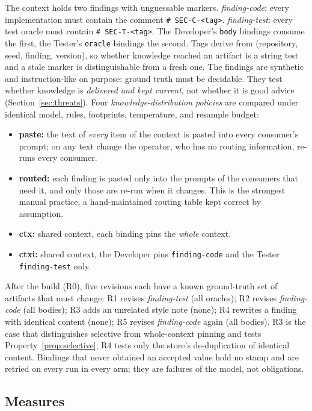 \documentclass[10pt,conference]{IEEEtran}
\theoremstyle{definition}
\newcommand{\code}[1]{\texttt{#1}}
\begin{document}
The context holds two findings with unguessable markers. \emph{finding-code}: every implementation must
contain the comment \code{\# SEC-C-<tag>}. \emph{finding-test}: every test oracle must contain
\code{\# SEC-T-<tag>}. The Developer's \code{body} bindings consume the first, the Tester's \code{oracle}
bindings the second. Tags derive from (repository, seed, finding, version), so whether knowledge reached an
artifact is a string test and a stale marker is distinguishable from a fresh one. The findings are synthetic
and instruction-like on purpose: ground truth must be decidable. They test whether knowledge is
\emph{delivered and kept current}, not whether it is good advice (Section~\ref{sec:threats}). Four
\emph{knowledge-distribution policies} are compared under identical model, rules, footprints, temperature,
and resample budget:

\begin{itemize}[leftmargin=*,itemsep=0pt,topsep=2pt]
\item \textbf{paste:} the text of \emph{every} item of the context is pasted into every consumer's prompt;
      on any text change the operator, who has no routing information, re-runs every consumer.
\item \textbf{routed:} each finding is pasted only into the prompts of the consumers that need it, and only
      those are re-run when it changes. This is the strongest manual practice, a hand-maintained
      routing table kept correct by assumption.
\item \textbf{ctx:} shared context, each binding pins the \emph{whole} context.
\item \textbf{ctxi:} shared context, the Developer pins \code{finding-code} and the Tester
      \code{finding-test} only.
\end{itemize}

After the build (R0), five revisions each have a known ground-truth set of artifacts that must change:
R1 revises \emph{finding-test} (all oracles); R2 revises \emph{finding-code} (all bodies); R3 adds an
unrelated style note (none); R4 rewrites a finding with identical content (none); R5 revises
\emph{finding-code} again (all bodies). R3 is the case that distinguishes selective from whole-context
pinning and tests Property~\ref{prop:selective}; R4 tests only the store's de-duplication of identical
content. Bindings that never obtained an accepted value hold no stamp and are retried on every run in
every arm; they are failures of the model, not obligations.

\subsection{Measures}
\end{document}

